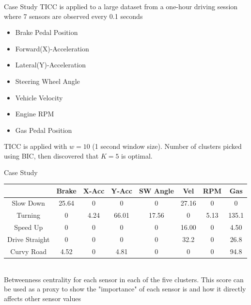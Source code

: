 \documentclass{beamer}
\begin{document}

\begin{frame}{Case Study}
	TICC is applied to a large dataset from a one-hour driving session where 7 sensors are observed every 0.1 seconds
	\begin{multicols}{2}
		\begin{itemize}
			\item Brake Pedal Position
			\item Forward(X)-Acceleration
			\item Lateral(Y)-Acceleration
			\item Steering Wheel Angle
		\end{itemize}%
		\columnbreak
		\begin{itemize}
			\item Vehicle Velocity
			\item Engine RPM
			\item Gas Pedal Position
		\end{itemize}
	\end{multicols}
	TICC is applied with $w = 10$ (1 second window size). Number of clusters picked using BIC, then discovered that $K = 5$ is optimal.
\end{frame}


\begin{frame}{Case Study}
	\begin{center}
		\footnotesize
		\begin{tabular}{c||c|c|c|c|c|c|c}
			 & Brake & X-Acc & Y-Acc & SW Angle & Vel & RPM & Gas \\ \hline\hline
			 Slow Down & 25.64 & 0 & 0 & 0 & 27.16 & 0 & 0 \\ \hline
			 Turning & 0 &  4.24 &  66.01 &  17.56 &  0 &  5.13 & 135.1 \\ \hline
			 Speed Up &  0 &  0 &  0 &  0 & 16.00 &  0 &  4.50 \\ \hline
			 Drive Straight &  0  & 0 &  0 &  0 & 32.2 &  0 &  26.8 \\ \hline
			 Curvy Road &  4.52 &  0 &  4.81 &  0 &  0 &  0 &  94.8 \\ \hline
		\end{tabular}\\
		\vspace{.5cm}
		{\normalsize Betweenness centrality for each sensor in each of the five clusters. This score can be used as a proxy to show the "importance" of each sensor is and how it directly affects other sensor values} 
	\end{center}
\end{frame}
\end{document}

